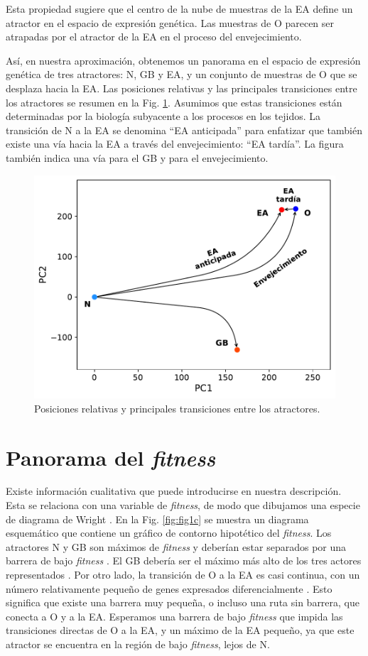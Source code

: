 Esta propiedad sugiere que el centro de la nube de muestras de la EA define un atractor en el espacio de expresión genética. Las muestras de O parecen ser atrapadas por el atractor de la EA en el proceso del envejecimiento.

Así, en nuestra aproximación, obtenemos un panorama en el espacio de expresión genética de tres atractores: N, GB y EA, y un conjunto de muestras de O que se desplaza hacia la EA. Las posiciones relativas y las principales transiciones entre los atractores se resumen en la Fig. \ref{fig:fig1b}. Asumimos que estas transiciones están determinadas por la biología subyacente a los procesos en los tejidos. La transición de N a la EA se denomina ``EA anticipada'' para enfatizar que también existe una vía hacia la EA a través del envejecimiento: ``EA tardía''. La figura también indica una vía para el GB y para el envejecimiento.

\begin{figure}[!htb]
	\centering
	\includegraphics[width=0.75\linewidth]{figures/Fig_1b.pdf}
	\caption{Posiciones relativas y principales transiciones entre los atractores.}
	\label{fig:fig1b}
\end{figure}

\section{Panorama del \textit{fitness}}\label{sec:sec22}

Existe información cualitativa que puede introducirse en nuestra descripción. Esta se relaciona con una variable de \emph{fitness}, de modo que dibujamos una especie de diagrama de Wright \cite{wright1932roles}. En la Fig. \ref{fig:fig1c} se muestra un diagrama esquemático que contiene un gráfico de contorno hipotético del \emph{fitness}. Los atractores N y GB son máximos de \emph{fitness} y deberían estar separados por una barrera de bajo \emph{fitness} \cite{Gonzalez_2021}. El GB debería ser el máximo más alto de los tres actores representados \cite{Gonzalez_2021, gonzalez2022estimating}. Por otro lado, la transición de O a la EA es casi continua, con un número relativamente pequeño de genes expresados diferencialmente \cite{Gonzalez_2021}. Esto significa que existe una barrera muy pequeña, o incluso una ruta sin barrera, que conecta a O y a la EA. Esperamos una barrera de bajo \emph{fitness} que impida las transiciones directas de O a la EA, y un máximo de la EA pequeño, ya que este atractor se encuentra en la región de bajo \emph{fitness}, lejos de N. 

